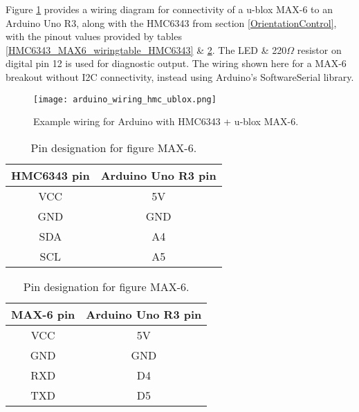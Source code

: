 Figure \ref{arduino_wiring_hmc_ublox.png} provides a wiring diagram for connectivity of a u-blox MAX-6 to an Arduino Uno R3, along with the HMC6343 from section \ref{OrientationControl}, with the pinout values provided by tables \ref{HMC6343_MAX6_wiringtable_HMC6343} \& \ref{HMC6343_MAX6_wiringtable_MAX6}. The LED \& 220$\Omega$ resistor on digital pin 12 is used for diagnostic output. The wiring shown here for a MAX-6 breakout without I2C connectivity, instead using Arduino's SoftwareSerial\softwareserialFootnote{} library.

\begin{figure}[h]
\centering
  \texttt{[image: arduino\_wiring\_hmc\_ublox.png]}
  \caption{Example wiring for Arduino with HMC6343 + u-blox MAX-6.}
  \label{arduino_wiring_hmc_ublox.png}
\end{figure}

\begin{table}
\begin{center}
\begin{minipage}[t]{.47\linewidth}
\begin{center}
\begin{tabular}{| c | c |}
\hline	
\textbf{HMC6343 pin} & \textbf{Arduino Uno R3 pin} \\
\hline
VCC & 5V\HMCvccFootnote{} \\
\hline
GND & GND \\
\hline
SDA & A4\itwocFootnote{} \\
\hline
SCL & A5 \\
\hline
\end{tabular}
\caption{Pin designation for figure HMC6343.}
\label{HMC6343_MAX6_wiringtable_HMC6343}
\end{center}
\end{minipage}
%
\begin{minipage}[t]{.47\linewidth}
\begin{center}
\begin{tabular}{| c | c |}
\hline	
\textbf{MAX-6 pin} & \textbf{Arduino Uno R3 pin} \\
\hline
VCC & 5V\MAXvccFootnote{} \\
\hline
GND & GND \\
\hline
RXD & D4 \MAXserialFootnote{}\\
\hline
TXD & D5 \\
\hline
\end{tabular}
\caption{Pin designation for figure MAX-6.}
\label{HMC6343_MAX6_wiringtable_MAX6}
\end{center}
\end{minipage}
\end{center}
\end{table}

